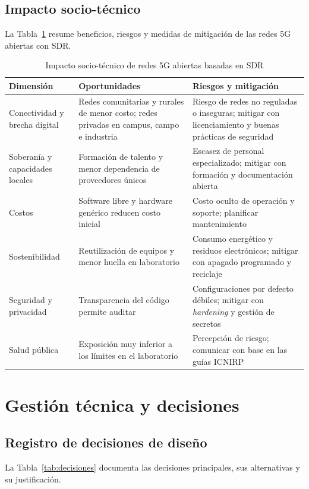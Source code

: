 \documentclass[conference]{IEEEtran}
\begin{document}
\subsection{Impacto socio-técnico}
La Tabla~\ref{tab:impacto} resume beneficios, riesgos y medidas de mitigación de las redes 5G abiertas con SDR.

\begin{table}[!t]
\caption{Impacto socio-técnico de redes 5G abiertas basadas en SDR}
\label{tab:impacto}
\centering
\footnotesize
\renewcommand{\arraystretch}{1.15}
\begin{tabular}{p{4.3cm}p{6.4cm}p{6.4cm}}
\toprule
\textbf{Dimensión} & \textbf{Oportunidades} & \textbf{Riesgos y mitigación} \\
\midrule
Conectividad y brecha digital & Redes comunitarias y rurales de menor costo; redes privadas en campus, campo e industria & Riesgo de redes no reguladas o inseguras; mitigar con licenciamiento y buenas prácticas de seguridad \\
Soberanía y capacidades locales & Formación de talento y menor dependencia de proveedores únicos & Escasez de personal especializado; mitigar con formación y documentación abierta \\
Costos & Software libre y hardware genérico reducen costo inicial & Costo oculto de operación y soporte; planificar mantenimiento \\
Sostenibilidad & Reutilización de equipos y menor huella en laboratorio & Consumo energético y residuos electrónicos; mitigar con apagado programado y reciclaje \\
Seguridad y privacidad & Transparencia del código permite auditar & Configuraciones por defecto débiles; mitigar con \textit{hardening} y gestión de secretos \\
Salud pública & Exposición muy inferior a los límites en el laboratorio & Percepción de riesgo; comunicar con base en las guías ICNIRP \\
\bottomrule
\end{tabular}
\end{table}

\section{Gestión técnica y decisiones}
\label{sec:gestion}

\subsection{Registro de decisiones de diseño}
La Tabla~\ref{tab:decisiones} documenta las decisiones principales, sus alternativas y su justificación.
\end{document}
